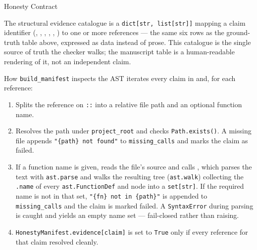 \documentclass[
  ignorenonframetext,
]{beamer}
\providecommand{\tightlist}{%
  \setlength{\itemsep}{0pt}\setlength{\parskip}{0pt}}
\begin{document}
\begin{frame}{Honesty Contract}
\begin{block}{The structural evidence catalogue}
\protect{}\label{the-structural-evidence-catalogue}
 is a
\texttt{dict{[}str,\ list{[}str{]}{]}} mapping a claim identifier
(, ,
, ,
, ) to one
or more  references --- the
same six rows as the ground-truth table above, expressed as data instead
of prose. This catalogue is the single source of truth the checker
walks; the manuscript table is a human-readable rendering of it, not an
independent claim.
\end{block}

\begin{block}{How \texttt{build\_manifest} inspects the AST}
\protect{}\label{how-build_manifest-inspects-the-ast}
 iterates every claim in
 and, for each 
reference:

\begin{enumerate}
\tightlist
\item
  Splits the reference on \texttt{::} into a relative file path and an
  optional function name.
\item
  Resolves the path under \texttt{project\_root} and checks
  \texttt{Path.exists()}. A missing file appends
  \texttt{"\{path\}\ not\ found"} to \texttt{missing\_calls} and marks
  the claim as failed.
\item
  If a function name is given, reads the file's source and calls
  , which parses the
  text with \texttt{ast.parse} and walks the resulting tree
  (\texttt{ast.walk}) collecting the \texttt{.name} of every
  \texttt{ast.FunctionDef} and  node into a
  \texttt{set{[}str{]}}. If the required name is not in that set,
  \texttt{"\{fn\}\ not\ in\ \{path\}"} is appended to
  \texttt{missing\_calls} and the claim is marked failed. A
  \texttt{SyntaxError} during parsing is caught and yields an empty name
  set --- fail-closed rather than raising.
\item
  \texttt{HonestyManifest.evidence{[}claim{]}} is set to \texttt{True}
  only if every reference for that claim resolved cleanly.
\end{enumerate}


\end{block}
\end{frame}
\end{document}
